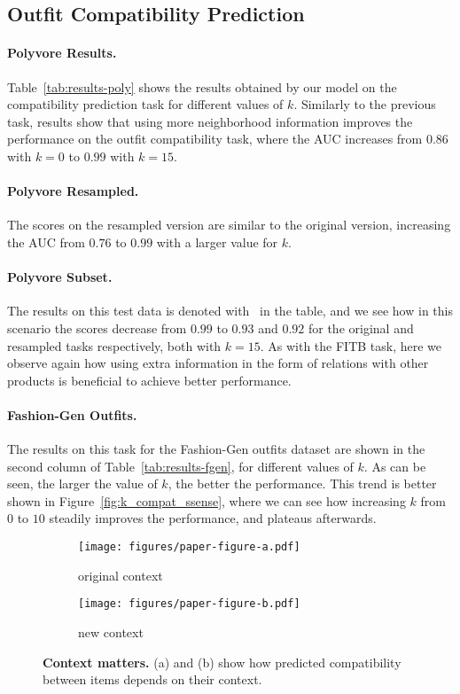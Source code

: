 \documentclass[10pt,twocolumn,letterpaper]{article}
\begin{document}
\subsection{Outfit Compatibility Prediction} \label{sec:compat_results}

\paragraph{Polyvore Results.} 
Table~\ref{tab:results-poly} shows the results obtained by our model on the compatibility prediction task for different values of $k$. 
Similarly to the previous task, results show that using more neighborhood information improves the performance on the outfit compatibility task, where the 
AUC increases from $0.86$ with $k=0$ to $0.99$ with $k=15$.

\paragraph{Polyvore Resampled.} 
The scores on the resampled version are similar to the original version, increasing the AUC from $0.76$ to $0.99$ with a larger value for $k$.

\paragraph{Polyvore Subset.} The results on this test data is denoted with \textdagger ~in the table, and we see how in this scenario the scores decrease from $0.99$ to $0.93$ and $0.92$ for the original and resampled tasks respectively, both with $k=15$.
As with the FITB task, here we observe again how using extra information in the form of relations with other products is beneficial to achieve better performance. 

\paragraph{Fashion-Gen Outfits.} 
The results on this task for the Fashion-Gen outfits dataset are shown in the second column of Table~\ref{tab:results-fgen}, for different values of $k$. As can be seen, the larger the value of $k$, the better the performance. This trend is better shown in Figure~\ref{fig:k_compat_ssense}, where we can see how increasing $k$ from $0$ to $10$ steadily improves the performance, and plateaus afterwards.

\begin{figure}[t]
\begin{center}
\begin{subfigure}{.40\textwidth}
  \centering
  \texttt{[image: figures/paper-figure-a.pdf]}
  \caption{original context}
  \label{fig:context_a}
\end{subfigure}
\begin{subfigure}{.40\textwidth}
  \centering
  \texttt{[image: figures/paper-figure-b.pdf]}
  \caption{new context}
  \label{fig:context_b}
\end{subfigure}\end{center}
\caption{\textbf{Context matters.} (a) and (b) show how predicted compatibility between items depends on their context.}
\label{fig:context}
\end{figure}
\end{document}
